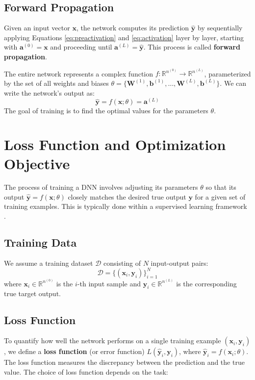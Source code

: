 \documentclass[11pt,twoside,openright]{report}
\begin{document}
\subsection{Forward Propagation}
Given an input vector $\mathbf{x}$, the network computes its prediction $\hat{\mathbf{y}}$ by sequentially applying Equations \ref{eq:preactivation} and \ref{eq:activation} layer by layer, starting with $\mathbf{a}^{(0)} = \mathbf{x}$ and proceeding until $\mathbf{a}^{(L)} = \hat{\mathbf{y}}$. This process is called \textbf{forward propagation}.

The entire network represents a complex function $f: \mathbb{R}^{n^{(0)}} \to \mathbb{R}^{n^{(L)}}$, parameterized by the set of all weights and biases $\theta = \{ \mathbf{W}^{(1)}, \mathbf{b}^{(1)}, \dots, \mathbf{W}^{(L)}, \mathbf{b}^{(L)} \}$. We can write the network's output as:
$$ \hat{\mathbf{y}} = f(\mathbf{x}; \theta) = \mathbf{a}^{(L)} $$
The goal of training is to find the optimal values for the parameters $\theta$.


\newpage

\section{Loss Function and Optimization Objective}

The process of training a DNN involves adjusting its parameters $\theta$ so that its output $\hat{\mathbf{y}} = f(\mathbf{x}; \theta)$ closely matches the desired true output $\mathbf{y}$ for a given set of training examples. This is typically done within a supervised learning framework \cite{goodfellow2016deep}.

\subsection{Training Data}
We assume a training dataset $\mathcal{D}$ consisting of $N$ input-output pairs:
$$ \mathcal{D} = \{ (\mathbf{x}_i, \mathbf{y}_i) \}_{i=1}^N $$
where $\mathbf{x}_i \in \mathbb{R}^{n^{(0)}}$ is the $i$-th input sample and $\mathbf{y}_i \in \mathbb{R}^{n^{(L)}}$ is the corresponding true target output.

\subsection{Loss Function}
To quantify how well the network performs on a single training example $(\mathbf{x}_i, \mathbf{y}_i)$, we define a \textbf{loss function} (or error function) $L(\hat{\mathbf{y}}_i, \mathbf{y}_i)$, where $\hat{\mathbf{y}}_i = f(\mathbf{x}_i; \theta)$. The loss function measures the discrepancy between the prediction and the true value. The choice of loss function depends on the task:
\end{document}
